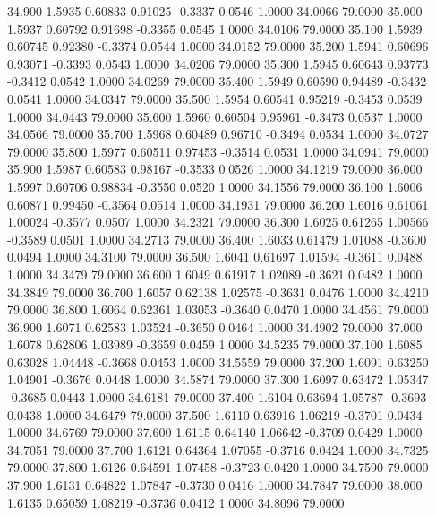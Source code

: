   34.900   1.5935   0.60833   0.91025  -0.3337   0.0546   1.0000  34.0066  79.0000
  35.000   1.5937   0.60792   0.91698  -0.3355   0.0545   1.0000  34.0106  79.0000
  35.100   1.5939   0.60745   0.92380  -0.3374   0.0544   1.0000  34.0152  79.0000
  35.200   1.5941   0.60696   0.93071  -0.3393   0.0543   1.0000  34.0206  79.0000
  35.300   1.5945   0.60643   0.93773  -0.3412   0.0542   1.0000  34.0269  79.0000
  35.400   1.5949   0.60590   0.94489  -0.3432   0.0541   1.0000  34.0347  79.0000
  35.500   1.5954   0.60541   0.95219  -0.3453   0.0539   1.0000  34.0443  79.0000
  35.600   1.5960   0.60504   0.95961  -0.3473   0.0537   1.0000  34.0566  79.0000
  35.700   1.5968   0.60489   0.96710  -0.3494   0.0534   1.0000  34.0727  79.0000
  35.800   1.5977   0.60511   0.97453  -0.3514   0.0531   1.0000  34.0941  79.0000
  35.900   1.5987   0.60583   0.98167  -0.3533   0.0526   1.0000  34.1219  79.0000
  36.000   1.5997   0.60706   0.98834  -0.3550   0.0520   1.0000  34.1556  79.0000
  36.100   1.6006   0.60871   0.99450  -0.3564   0.0514   1.0000  34.1931  79.0000
  36.200   1.6016   0.61061   1.00024  -0.3577   0.0507   1.0000  34.2321  79.0000
  36.300   1.6025   0.61265   1.00566  -0.3589   0.0501   1.0000  34.2713  79.0000
  36.400   1.6033   0.61479   1.01088  -0.3600   0.0494   1.0000  34.3100  79.0000
  36.500   1.6041   0.61697   1.01594  -0.3611   0.0488   1.0000  34.3479  79.0000
  36.600   1.6049   0.61917   1.02089  -0.3621   0.0482   1.0000  34.3849  79.0000
  36.700   1.6057   0.62138   1.02575  -0.3631   0.0476   1.0000  34.4210  79.0000
  36.800   1.6064   0.62361   1.03053  -0.3640   0.0470   1.0000  34.4561  79.0000
  36.900   1.6071   0.62583   1.03524  -0.3650   0.0464   1.0000  34.4902  79.0000
  37.000   1.6078   0.62806   1.03989  -0.3659   0.0459   1.0000  34.5235  79.0000
  37.100   1.6085   0.63028   1.04448  -0.3668   0.0453   1.0000  34.5559  79.0000
  37.200   1.6091   0.63250   1.04901  -0.3676   0.0448   1.0000  34.5874  79.0000
  37.300   1.6097   0.63472   1.05347  -0.3685   0.0443   1.0000  34.6181  79.0000
  37.400   1.6104   0.63694   1.05787  -0.3693   0.0438   1.0000  34.6479  79.0000
  37.500   1.6110   0.63916   1.06219  -0.3701   0.0434   1.0000  34.6769  79.0000
  37.600   1.6115   0.64140   1.06642  -0.3709   0.0429   1.0000  34.7051  79.0000
  37.700   1.6121   0.64364   1.07055  -0.3716   0.0424   1.0000  34.7325  79.0000
  37.800   1.6126   0.64591   1.07458  -0.3723   0.0420   1.0000  34.7590  79.0000
  37.900   1.6131   0.64822   1.07847  -0.3730   0.0416   1.0000  34.7847  79.0000
  38.000   1.6135   0.65059   1.08219  -0.3736   0.0412   1.0000  34.8096  79.0000
